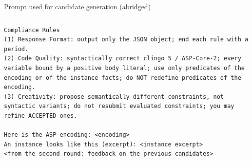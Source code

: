 \documentclass[10pt,aspectratio=169]{beamer}
\begin{document}
\begin{frame}[fragile]{Prompt used for candidate generation (abridged)}
\begin{columns}[T,onlytextwidth]
\begin{lstlisting}[basicstyle=\ttfamily\fontsize{5.3}{6.1}\selectfont,deletecomment={[l]\%},breakatwhitespace=true,breakindent=0pt,breakautoindent=false,aboveskip=0pt]
Compliance Rules
(1) Response Format: output only the JSON object; end each rule with a period.
(2) Code Quality: syntactically correct clingo 5 / ASP-Core-2; every variable bound by a positive body literal; use only predicates of the encoding or of the instance facts; do NOT redefine predicates of the encoding.
(3) Creativity: propose semantically different constraints, not syntactic variants; do not resubmit evaluated constraints; you may refine ACCEPTED ones.

Here is the ASP encoding: <encoding>
An instance looks like this (excerpt): <instance excerpt>
<from the second round: feedback on the previous candidates>
\end{lstlisting}
\end{columns}
\end{frame}
\end{document}

